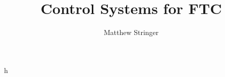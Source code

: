 \documentclass[12pt]{article}
\title{Control Systems for FTC}
\author{Matthew Stringer}
\date{}
\begin{document}
    \maketitle
    \newpage
    h
\end{document}
